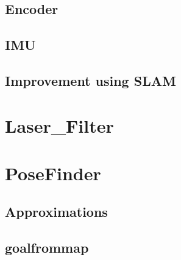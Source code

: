 \subsection{Encoder}
\subsection{IMU}
\subsection{Improvement using SLAM}
\section{Laser\_Filter}
\section{PoseFinder}
\subsection{Approximations}
\subsection{goalfrommap}







